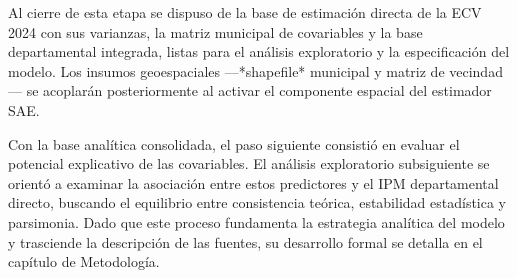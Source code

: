 Al cierre de esta etapa se dispuso de la base de estimación directa de la ECV 2024 con sus varianzas, la matriz municipal de covariables y la base departamental integrada, listas para el análisis exploratorio y la especificación del modelo. Los insumos geoespaciales —*shapefile* municipal y matriz de vecindad— se acoplarán posteriormente al activar el componente espacial del estimador SAE.

Con la base analítica consolidada, el paso siguiente consistió en evaluar el potencial explicativo de las covariables. El análisis exploratorio subsiguiente se orientó a examinar la asociación entre estos predictores y el IPM departamental directo, buscando el equilibrio entre consistencia teórica, estabilidad estadística y parsimonia. Dado que este proceso fundamenta la estrategia analítica del modelo y trasciende la descripción de las fuentes, su desarrollo formal se detalla en el capítulo de Metodología.